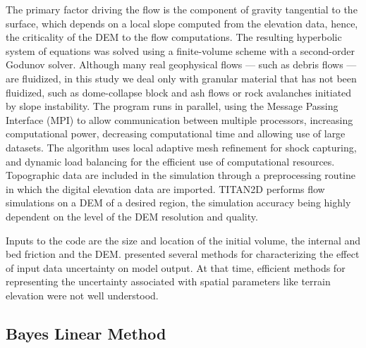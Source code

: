 \documentclass[12pt]{article}
\begin{document}
The primary factor driving the flow is the component of gravity
tangential to the surface, which depends on a local slope computed
from the elevation data, hence, the criticality of the DEM to the flow
computations. The resulting hyperbolic system of equations was solved
using a finite-volume scheme with a second-order Godunov
solver. Although many real geophysical flows --- such as debris flows
--- are fluidized, in this study we deal only with granular material
that has not been fluidized, such as dome-collapse block and ash flows
or rock avalanches initiated by slope instability.  The program runs
in parallel, using the Message Passing Interface (MPI) to allow
communication between multiple processors, increasing computational
power, decreasing computational time and allowing use of large
datasets. The algorithm uses local adaptive mesh refinement for shock
capturing, and dynamic load balancing for the efficient use of
computational resources. Topographic data are included in the
simulation through a preprocessing routine in which the digital
elevation data are imported.  TITAN2D performs flow simulations on a
DEM of a desired region, the simulation accuracy being highly
dependent on the level of the DEM resolution and quality.

Inputs to the code are the size and location of the initial volume,
the internal and bed friction and the DEM. \citet{Keith} presented
several methods for characterizing the effect of input data
uncertainty on model output. At that time, efficient methods for
representing the uncertainty associated with spatial parameters like
terrain elevation were not well understood.

\subsection{Bayes Linear Method}
\end{document}
